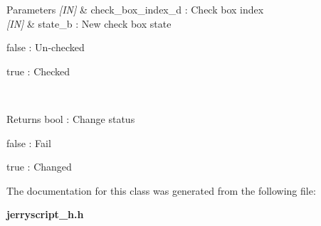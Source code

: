 \begin{DoxyCode}{0}
\end{DoxyCode}



\begin{DoxyParams}{Parameters}
{\em \mbox{[}\+I\+N\mbox{]}} & check\+\_\+box\+\_\+index\+\_\+d \+: Check box index \\
\hline
{\em \mbox{[}\+I\+N\mbox{]}} & state\+\_\+b \+: New check box state \begin{DoxyItemize}
\item false \+: Un-\/checked \item true \+: Checked \end{DoxyItemize}
\\
\hline
\end{DoxyParams}
\begin{DoxyReturn}{Returns}
bool \+: Change status \begin{DoxyItemize}
\item false \+: Fail \item true \+: Changed \end{DoxyItemize}

\end{DoxyReturn}


The documentation for this class was generated from the following file\+:\begin{DoxyCompactItemize}
\item 
\textbf{ jerryscript\+\_\+h.\+h}\end{DoxyCompactItemize}

